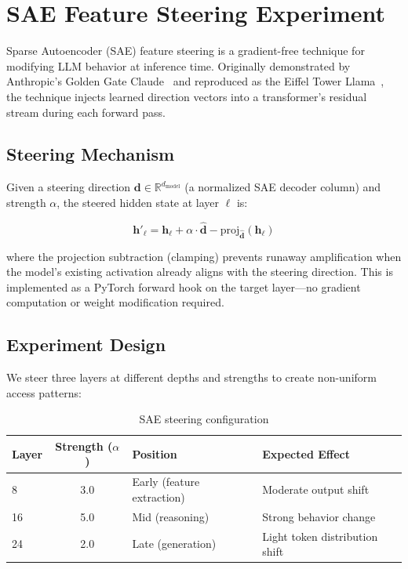 \documentclass[11pt,letterpaper]{article}
\begin{document}
\section{SAE Feature Steering Experiment}
\label{sec:sae-steering}

Sparse Autoencoder (SAE) feature steering is a gradient-free technique for modifying LLM behavior at inference time. Originally demonstrated by Anthropic's Golden Gate Claude~\cite{golden-gate-claude} and reproduced as the Eiffel Tower Llama~\cite{eiffel-tower-llama}, the technique injects learned direction vectors into a transformer's residual stream during each forward pass.

\subsection{Steering Mechanism}

Given a steering direction $\mathbf{d} \in \mathbb{R}^{d_\text{model}}$ (a normalized SAE decoder column) and strength $\alpha$, the steered hidden state at layer $\ell$ is:

\begin{equation}
    \mathbf{h}'_\ell = \mathbf{h}_\ell + \alpha \cdot \hat{\mathbf{d}} - \text{proj}_{\hat{\mathbf{d}}}(\mathbf{h}_\ell)
    \label{eq:steering}
\end{equation}

where the projection subtraction (clamping) prevents runaway amplification when the model's existing activation already aligns with the steering direction. This is implemented as a PyTorch forward hook on the target layer---no gradient computation or weight modification required.

\subsection{Experiment Design}

We steer three layers at different depths and strengths to create non-uniform access patterns:

\begin{table}[htbp]
\centering
\caption{SAE steering configuration}
\label{tab:steering-config}
\begin{tabular}{@{}lcll@{}}
\toprule
\textbf{Layer} & \textbf{Strength ($\alpha$)} & \textbf{Position} & \textbf{Expected Effect} \\
\midrule
8  & 3.0 & Early (feature extraction) & Moderate output shift \\
16 & 5.0 & Mid (reasoning) & Strong behavior change \\
24 & 2.0 & Late (generation) & Light token distribution shift \\
\bottomrule
\end{tabular}
\end{table}
\end{document}
